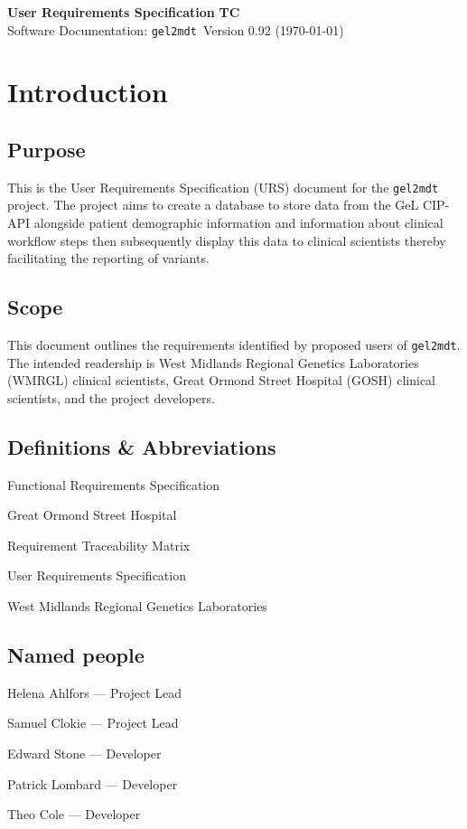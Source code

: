 \documentclass[a4paper, 10pt]{article}
\begin{document}
\noindent
\large\textbf{User Requirements Specification} \hfill \textbf{TC} \\
\normalsize Software Documentation: \texttt{gel2mdt }\hfill Version 0.92 (\today) \\

\tableofcontents

\section{Introduction}
\subsection{Purpose}
This is the User Requirements Specification (URS) document for the \texttt{gel2mdt} project. The project aims to create a database to store data from the GeL CIP-API alongside patient demographic information and information about clinical workflow steps then subsequently display this data to clinical scientists thereby facilitating the reporting of variants.

\subsection{Scope}
This document outlines the requirements identified by proposed users of \texttt{gel2mdt}. The intended readership is West Midlands Regional Genetics Laboratories (WMRGL) clinical scientists, Great Ormond Street Hospital (GOSH) clinical scientists, and the project developers.

\subsection{Definitions \& Abbreviations}
\begin{description}[align=right,labelwidth=2cm]
\setlength\itemsep{-0.3em}
\item [FRS] Functional Requirements Specification
\item [GOSH] Great Ormond Street Hospital
\item [RTM] Requirement Traceability Matrix
\item [URS] User Requirements Specification
\item [WMRGL] West Midlands Regional Genetics Laboratories
\end{description}

\subsection{Named people}
\begin{description}[align=right,labelwidth=2cm]
\setlength\itemsep{-0.3em}
\item [HA]  Helena Ahlfors --- Project Lead
\item [SC]  Samuel Clokie --- Project Lead
\item [ES]  Edward Stone --- Developer
\item [PL]  Patrick Lombard --- Developer
\item [TC]  Theo Cole --- Developer
\end{description}
\end{document}
